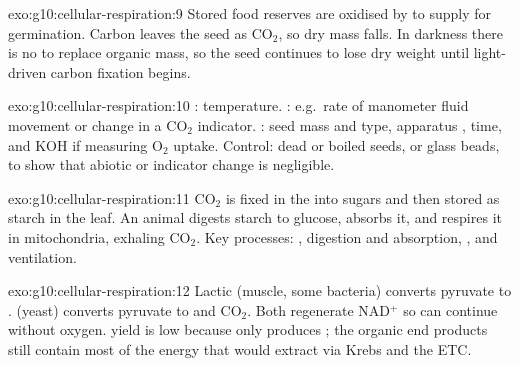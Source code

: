 \begin{solution}{exo:g10:cellular-respiration:9}
Stored food reserves are oxidised by  to supply  for
germination. Carbon leaves the seed as $\mathrm{CO_2}$, so dry mass falls. In
darkness there is no  to replace organic mass, so the seed
continues to lose dry weight until light-driven carbon fixation begins.
\end{solution}

\begin{solution}{exo:g10:cellular-respiration:10}
: temperature. : e.g.\ rate of manometer
fluid movement or change in a $\mathrm{CO_2}$ indicator. :
seed mass and type, apparatus , time, and KOH if measuring $\mathrm{O_2}$
uptake. Control: dead or boiled seeds, or glass beads, to show that abiotic
 or indicator change is negligible.
\end{solution}

\begin{solution}{exo:g10:cellular-respiration:11}
$\mathrm{CO_2}$ is fixed in the  into sugars and then stored as
starch in the leaf. An animal digests starch to glucose, absorbs it, and
respires it in mitochondria, exhaling $\mathrm{CO_2}$. Key processes:
, digestion and absorption, , and
ventilation.
\end{solution}

\begin{solution}{exo:g10:cellular-respiration:12}
Lactic  (muscle, some bacteria) converts pyruvate to .
 (yeast) converts pyruvate to  and $\mathrm{CO_2}$.
Both regenerate NAD$^+$ so  can continue without oxygen.  yield
is low because only  produces ; the organic end products still
contain most of the energy that  would extract via Krebs
and the ETC.
\end{solution}

